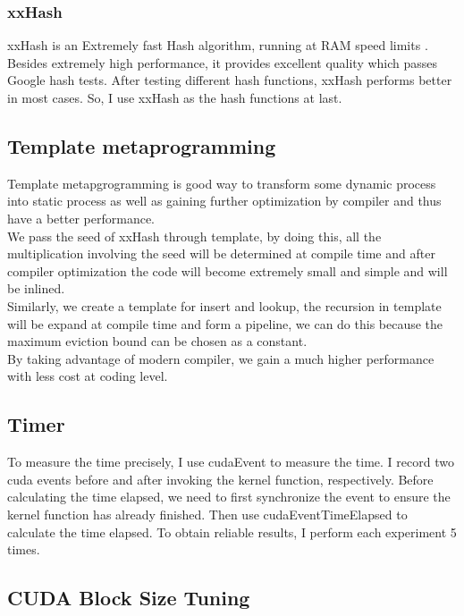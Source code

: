 \documentclass[10pt,twocolumn,letterpaper]{article}
\begin{document}
\subsubsection{xxHash}

xxHash is an Extremely fast Hash algorithm, running at RAM speed limits \cite{collet2016xxhash}. Besides extremely high performance, it provides excellent quality which passes Google hash tests. After testing different hash functions, xxHash performs better in most cases. So, I use xxHash as the hash functions at last.

\subsection{Template metaprogramming}

Template metapgrogramming is good way to transform some dynamic process into static process as well as gaining further optimization by compiler and thus have a better performance. \\
We pass the seed of xxHash through template, by doing this, all the multiplication involving the seed will be determined at compile time and after compiler optimization the code will become extremely small and simple and will be inlined.\\
Similarly, we create a template for insert and lookup, the recursion in template will be expand at compile time and form a pipeline, we can do this because the maximum eviction bound can be chosen as a constant.\\
By taking advantage of modern compiler, we gain a much higher performance with less cost at coding level.

\subsection{Timer}

To measure the time precisely, I use cudaEvent to measure the time. I record two cuda events before and after invoking the kernel function, respectively. Before calculating the time elapsed, we need to first synchronize the event to ensure the kernel function has already finished. Then use cudaEventTimeElapsed to calculate the time elapsed. To obtain reliable results, I perform each experiment 5 times. 

\subsection{CUDA Block Size Tuning}
\end{document}
